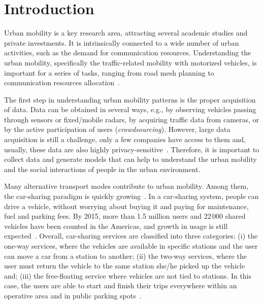 \section{Introduction}
\label{sec:3_1_intro}

Urban mobility is a key research area, attracting several academic studies and private investments. It is intrinsically connected to a wide number of urban activities, such as the demand for communication resources. 
Understanding the urban mobility, specifically the traffic-related mobility with motorized vehicles, is important for a series of tasks, ranging from road mesh planning to communication resources allocation~\cite{herrera:10, Ma:2013}.

The first step in understanding urban mobility patterns is the proper acquisition of data. Data can be obtained in several ways, e.g., by observing vehicles passing through sensors or fixed/mobile radars, by acquiring traffic data from cameras, or by the active participation of users (\textit{crowdsourcing}).  However, large data acquisition is still a challenge, only a few companies have access to them and, usually, these data are also highly privacy-sensitive~\cite{ciociolaumap}. Therefore, it is important to collect data and generate models that can help to understand the urban mobility and the social interactions of people in the urban environment.

Many alternative transport modes contribute to urban mobility. Among them, the car-sharing paradigm is quickly growing~\cite{boldrini:16,ciociolaumap,becker2017comparing}. In a car-sharing system, people can drive a vehicle, without worrying about buying it and paying for maintenance, fuel and parking fees. %
By 2015, more than 1.5 million users and 22\,000 shared vehicles have been counted in the Americas, and growth in usage is still expected~\cite{shaheen2016mobility}. 
Overall, car-sharing services are classified into three categories: (i) the one-way services, where the vehicles are available in specific stations and the user can move a car from a station to another; (ii) the two-way services, where the user must return the vehicle to the same station she/he picked up the vehicle and; (iii) the free-floating service where vehicles are not tied to stations. In this case, the users are able to start and finish their trips everywhere within an operative area and in public parking spots~\cite{boldrini:16}. 

